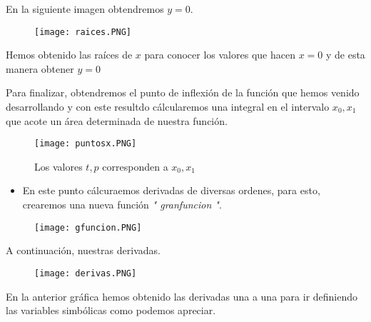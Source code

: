 \documentclass[letterpaper]{article}
\begin{document}
\vspace{\baselineskip}

\begin{justify}
    En la siguiente imagen obtendremos \textbf{\(y=0\)}.
\end{justify}
\begin{figure}[H]
    \centering
    \texttt{[image: raices.PNG]}        
\end{figure}
\begin{justify}
    Hemos obtenido las raíces de \(x\) para conocer los valores que hacen \(x =0\) y de esta manera
    obtener \(y=0\)
\end{justify}

\vspace{\baselineskip}

\begin{justify}
 Para finalizar, obtendremos el punto de inflexión de la función que hemos venido desarrollando
 y con este resultdo cálcularemos una integral en el intervalo \(x_0 , x_1\) que acote un área determinada de nuestra función.
\end{justify}
\begin{figure}[H]
    \centering
    \texttt{[image: puntosx.PNG]} 
    \caption{Los valores \(t , p\) corresponden a \(x_0 , x_1 \) }       
\end{figure}

\vspace{\baselineskip}

\begin{itemize}
    \item En este punto cálcuraemos derivadas de diversas ordenes, para esto, crearemos una nueva función \textit{" granfuncion "}.
\end{itemize}
\begin{figure}[H]
    \centering
    \texttt{[image: gfuncion.PNG]}        
\end{figure}
\begin{justify}
    A continuación, nuestras derivadas.
\end{justify}
\begin{figure}[H]
    \centering
    \texttt{[image: derivas.PNG]}        
\end{figure}
\begin{justify}
    En la anterior gráfica hemos obtenido las derivadas una a una para ir definiendo las variables simbólicas como podemos apreciar.
\end{justify}
\end{document}
